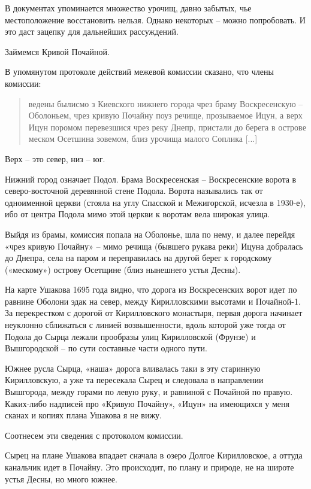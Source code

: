 В документах упоминается множество урочищ, давно забытых, чье местоположение восстановить нельзя. Однако некоторых – можно попробовать. И это даст зацепку для дальнейших рассуждений.

Займемся Кривой Почайной.

В упомянутом протоколе действий межевой комиссии сказано, что члены комиссии:

\begin{quotation}
ведены былисмо з Киевского нижнего города чрез браму Воскресенскую – Оболоньем, чрез кривую Почайну поуз речище, прозываемое Ицун, а верх Ицун поромом перевезшися чрез реку Днепр, пристали до берега в острове меском Осетшина зовемом, близ урочища малого Соплика [...]
\end{quotation}

Верх – это север, низ – юг.

Нижний город означает Подол. Брама Воскресенская – Воскресенские ворота в северо-восточной деревянной стене Подола. Ворота назывались так от одноименной церкви (стояла на углу Спасской и Межигорской, исчезла в 1930-е), ибо от центра Подола мимо этой церкви к воротам вела широкая улица.

Выйдя из брамы, комиссия попала на Оболонье, шла по нему, и далее перейдя «чрез кривую Почайну» –  мимо речища (бывшего рукава реки) Ицуна добралась до Днепра, села на паром и переправилась на другой берег к городскому («мескому») острову Осетщине (близ нынешнего устья Десны).

На карте Ушакова 1695 года видно, что дорога из Воскресенских ворот идет по равнине Оболони эдак на север, между Кирилловскими высотами и Почайной-1. За перекрестком с дорогой от Кирилловского монастыря, первая дорога начинает неуклонно сближаться с линией возвышенности, вдоль которой уже тогда от Подола до Сырца лежали прообразы улиц Кирилловской (Фрунзе) и Вышгородской – по сути составные части одного пути. 

Южнее русла Сырца, «наша» дорога вливалась таки в эту старинную Кирилловскую, а уже та пересекала Сырец и следовала в направлении Вышгорода, между горами по левую руку, и равниной с Почайной по правую. Каких-либо надписей про «Кривую Почайну», «Ицун» на имеющихся у меня сканах и копиях плана Ушакова я не вижу.

Соотнесем эти сведения с протоколом комиссии. 

Сырец на плане Ушакова впадает сначала в озеро Долгое Кирилловское, а оттуда канальчик идет в Почайну. Это происходит, по плану и природе, не на широте устья Десны, но много южнее.

